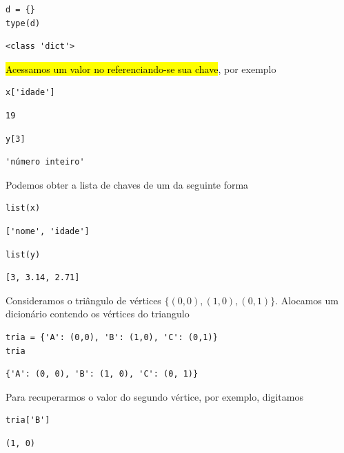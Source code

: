 \begin{lstlisting}
d = {}
type(d)
\end{lstlisting}

\begin{verbatim}
<class 'dict'>
\end{verbatim}
  

\hl{Acessamos um valor no {\PYTHONdict} referenciando-se sua chave}, por exemplo

\begin{lstlisting}
x['idade']
\end{lstlisting}

\begin{verbatim}
19
\end{verbatim}

\begin{lstlisting}
y[3]
\end{lstlisting}

\begin{verbatim}
'número inteiro'
\end{verbatim}


Podemos obter a lista de chaves de um {\PYTHONdict} da seguinte forma

\begin{lstlisting}
list(x)
\end{lstlisting}

\begin{verbatim}
['nome', 'idade']
\end{verbatim}

\begin{lstlisting}
list(y)
\end{lstlisting}

\begin{verbatim}
[3, 3.14, 2.71]
\end{verbatim}


\begin{ex}\label{cap_lingua_sec_colecao:ex:tria0}
Consideramos o triângulo de vértices $\{(0,0), (1,0), (0,1)\}$. Alocamos um dicionário contendo os vértices do triangulo

\begin{lstlisting}
tria = {'A': (0,0), 'B': (1,0), 'C': (0,1)}
tria
\end{lstlisting}

\begin{verbatim}
{'A': (0, 0), 'B': (1, 0), 'C': (0, 1)}
\end{verbatim}

Para recuperarmos o valor do segundo vértice, por exemplo, digitamos

\begin{lstlisting}
tria['B']
\end{lstlisting}

\begin{verbatim}
(1, 0)
\end{verbatim}

\end{ex}


